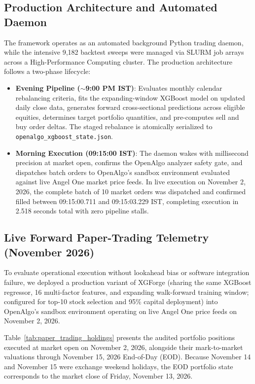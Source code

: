 \subsection{Production Architecture and Automated Daemon}
The framework operates as an automated background Python trading daemon, while the intensive 9,182 backtest sweeps were managed via SLURM job arrays across a High-Performance Computing cluster. The production architecture follows a two-phase lifecycle:
\begin{itemize}
    \item \textbf{Evening Pipeline ($\sim$9:00 PM IST)}: Evaluates monthly calendar rebalancing criteria, fits the expanding-window XGBoost model on updated daily close data, generates forward cross-sectional predictions across eligible equities, determines target portfolio quantities, and pre-computes sell and buy order deltas. The staged rebalance is atomically serialized to \texttt{openalgo\_xgboost\_state.json}.
    \item \textbf{Morning Execution (09:15:00 IST)}: The daemon wakes with millisecond precision at market open, confirms the OpenAlgo analyzer safety gate, and dispatches batch orders to OpenAlgo's sandbox environment evaluated against live Angel One market price feeds. In live execution on November 2, 2026, the complete batch of 10 market orders was dispatched and confirmed filled between 09:15:00.711 and 09:15:03.229 IST, completing execution in 2.518 seconds total with zero pipeline stalls.
\end{itemize}

\subsection{Live Forward Paper-Trading Telemetry (November 2026)}
\label{sec:paper_trading}
To evaluate operational execution without lookahead bias or software integration failure, we deployed a production variant of XGForge (sharing the same XGBoost regressor, 16 multi-factor features, and expanding walk-forward training window; configured for top-10 stock selection and 95\% capital deployment) into OpenAlgo's sandbox environment operating on live Angel One price feeds on November 2, 2026.

Table~\ref{tab:paper_trading_holdings} presents the audited portfolio positions executed at market open on November 2, 2026, alongside their mark-to-market valuations through November 15, 2026 End-of-Day (EOD). Because November 14 and November 15 were exchange weekend holidays, the EOD portfolio state corresponds to the market close of Friday, November 13, 2026.

